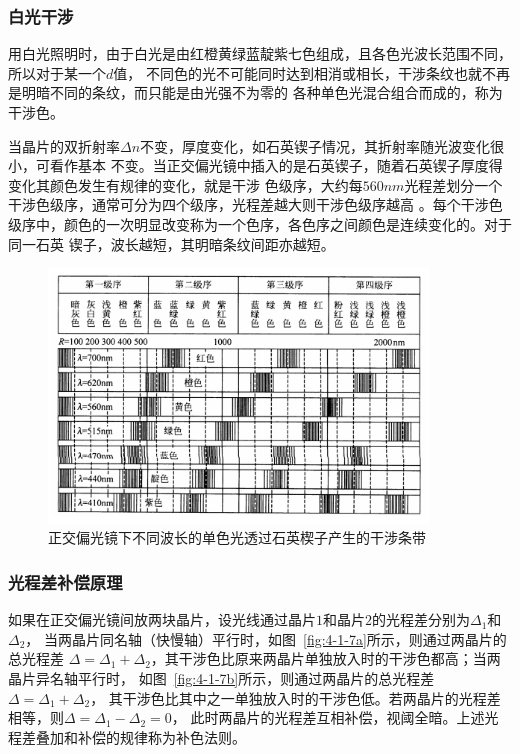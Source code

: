 \documentclass[11pt,a4paper]{article}
\begin{document}
\begin{spacing}{1.3}
\begin{CJK*}{UTF8}{gbsn}
\subsubsection{白光干涉}
用白光照明时，由于白光是由红橙黄绿蓝靛紫七色组成，且各色光波长范围不同，所以对于某一个$d$值，
不同色的光不可能同时达到相消或相长，干涉条纹也就不再是明暗不同的条纹，而只能是由光强不为零的
各种单色光混合组合而成的，称为干涉色。\par
当晶片的双折射率$\Delta n$不变，厚度变化，如石英锲子情况，其折射率随光波变化很小，可看作基本
不变。当正交偏光镜中插入的是石英锲子，随着石英锲子厚度得变化其颜色发生有规律的变化，就是干涉
色级序，大约每$560nm$光程差划分一个干涉色级序，通常可分为四个级序，光程差越大则干涉色级序越高
。每个干涉色级序中，颜色的一次明显改变称为一个色序，各色序之间颜色是连续变化的。对于同一石英
锲子，波长越短，其明暗条纹间距亦越短。
\begin{figure}
\centering
\includegraphics[width=0.9\textwidth]{fig4-1-6}
\caption{正交偏光镜下不同波长的单色光透过石英楔子产生的干涉条带}
\label{fig:4-1-6}
\end{figure}

\subsubsection{光程差补偿原理}
如果在正交偏光镜间放两块晶片，设光线通过晶片$1$和晶片$2$的光程差分别为$\Delta_1$和$\Delta_2$，
当两晶片同名轴（快慢轴）平行时，如图~\ref{fig:4-1-7a}所示，则通过两晶片的总光程差
$\Delta=\Delta_1+\Delta_2$，其干涉色比原来两晶片单独放入时的干涉色都高；当两晶片异名轴平行时，
如图~\ref{fig:4-1-7b}所示，则通过两晶片的总光程差$\Delta=\Delta_1+\Delta_2$，
其干涉色比其中之一单独放入时的干涉色低。若两晶片的光程差相等，则$\Delta=\Delta_1-\Delta_2=0$，
此时两晶片的光程差互相补偿，视阈全暗。上述光程差叠加和补偿的规律称为补色法则。


\end{CJK*}
\end{spacing}
\end{document}

